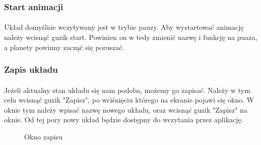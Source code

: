\subsubsection{Start animacji}\label{ssub:start animacji}
\paragraph{}

Układ domyślnie wczytywany jest w trybie pauzy. Aby wystartować animację należy wcisnąć guzik start. Powinien on w tedy zmienić nazwę i funkcję na puaza, a planety powinny zacząć się poruszać.


\subsubsection{Zapis układu}\label{ssub:zapis ukladu}
\paragraph{}

Jeżeli aktualny stan układu się nam podoba, możemy go zapisać. Należy w tym celu wcisnąć guzik "Zapisz", po wciśnięciu którego na ekranie pojawi się okno. W oknie tym należy wpisać nazwę nowego układu, oraz wcisnąć guzik "Zapisz" na oknie. Od tej pory nowy układ będzie dostępny do wczytania przez aplikację.


\begin{figure}[ht!]
\centering
{}
\caption{Okno zapisu}
\label{fig:inst_04}
\end{figure}

